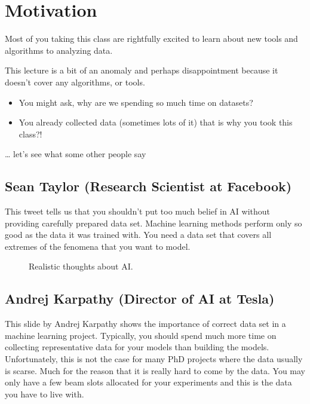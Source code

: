 \documentclass[letterpaper,10pt,english]{sphinxmanual}
\begin{document}
\chapter{Motivation}
\label{\detokenize{03-Datasets:motivation}}
\sphinxAtStartPar
{}

\sphinxAtStartPar
Most of you taking this class are rightfully excited to learn about new tools and algorithms to analyzing  data.

\sphinxAtStartPar
This lecture is a bit of an anomaly and perhaps disappointment because it doesn’t cover any algorithms, or tools.
\begin{itemize}
\item {} 
\sphinxAtStartPar
You might ask, why are we spending so much time on datasets?

\item {} 
\sphinxAtStartPar
You already collected data (sometimes lots of it) that is why you took this class?!

\end{itemize}

\sphinxAtStartPar
… let’s see what some other people say


\section{Sean Taylor (Research Scientist at Facebook)}
\label{\detokenize{03-Datasets:sean-taylor-research-scientist-at-facebook}}
\sphinxAtStartPar
This tweet tells us that you shouldn’t put too much belief in AI without providing carefully prepared data set. Machine learning methods perform only so good as the data it was trained with. You need a data set that covers all extremes of the fenomena that you want to model.

\begin{figure}[htbp]
\centering
\capstart

\noindent{}
\caption{Realistic thoughts about AI.}\label{\detokenize{03-Datasets:id3}}\end{figure}




\section{Andrej Karpathy (Director of AI at Tesla)}
\label{\detokenize{03-Datasets:andrej-karpathy-director-of-ai-at-tesla}}
\sphinxAtStartPar
This slide by Andrej Karpathy shows the importance of correct data set in a machine learning project. Typically, you should spend much more time on collecting representative data for your models than building the models. Unfortunately, this is not the case for many PhD projects where the data usually is scarse. Much for the reason that it is really hard to come by the data. You may only have a few beam slots allocated for your experiments and this is the data you have to live with.
\end{document}
